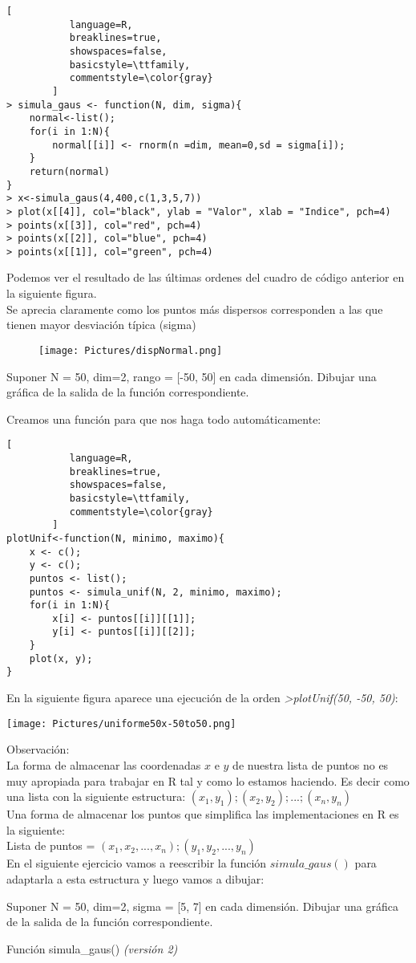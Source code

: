 \documentclass[11pt,fleqn]{book} %
\begin{document}
\begin{lstlisting}[
           language=R,
           breaklines=true,
           showspaces=false,
           basicstyle=\ttfamily,
           commentstyle=\color{gray}
        ]
> simula_gaus <- function(N, dim, sigma){
    normal<-list();
    for(i in 1:N){
        normal[[i]] <- rnorm(n =dim, mean=0,sd = sigma[i]);
    }
    return(normal)
}
> x<-simula_gaus(4,400,c(1,3,5,7))
> plot(x[[4]], col="black", ylab = "Valor", xlab = "Indice", pch=4)
> points(x[[3]], col="red", pch=4)
> points(x[[2]], col="blue", pch=4)
> points(x[[1]], col="green", pch=4)
\end{lstlisting}
Podemos ver el resultado de las últimas ordenes del cuadro de código anterior en la siguiente figura.\\
Se aprecia claramente como los puntos más dispersos corresponden a las que tienen mayor desviación típica (sigma)
\begin{figure}[h]
\texttt{[image: Pictures/dispNormal.png]}
\end{figure}

\begin{exercise}
Suponer N = 50, dim=2, rango = [-50, 50] en cada dimensión. Dibujar una gráfica de la salida de la función correspondiente.
\end{exercise}
Creamos una función para que nos haga todo automáticamente:
\begin{lstlisting}[
           language=R,
           breaklines=true,
           showspaces=false,
           basicstyle=\ttfamily,
           commentstyle=\color{gray}
        ]
plotUnif<-function(N, minimo, maximo){
    x <- c();
    y <- c();
    puntos <- list();
    puntos <- simula_unif(N, 2, minimo, maximo);
    for(i in 1:N){
        x[i] <- puntos[[i]][[1]];
        y[i] <- puntos[[i]][[2]];
    }
    plot(x, y);
}
\end{lstlisting}
En la siguiente figura aparece una ejecución de la orden \textit{>plotUnif(50, -50, 50)}:

\texttt{[image: Pictures/uniforme50x-50to50.png]}

Observación:\\
La forma de almacenar las coordenadas $x$ e $y$ de nuestra lista de puntos no es muy apropiada para trabajar en R tal y como lo estamos haciendo. Es decir como una lista con la siguiente estructura: $(x_1, y_1) ; (x_2, y_2) ; ... ; (x_n, y_n)$ \\
Una forma de almacenar los puntos que simplifica las implementaciones en R es la siguiente:\\
Lista de puntos = $(x_1, x_2, ..., x_n) ; (y_1, y_2, ..., y_n)$\\
En el siguiente ejercicio vamos a reescribir la función $simula\_gaus()$ para adaptarla a esta estructura y luego vamos a dibujar:
\begin{exercise}
Suponer N = 50, dim=2, sigma = [5, 7] en cada dimensión. Dibujar una gráfica de la salida de la función correspondiente.
\end{exercise}
Función simula\_gaus() \textit{(versión 2)}
\end{document}
